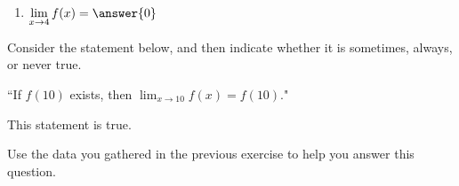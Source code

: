 \documentclass[handout]{ximera}
\begin{document}
\begin{exercise}
\begin{enumerate}

\item [] $\displaystyle\lim_{x\to 4} f(x) = \answer{0}$ 

\end{enumerate}

\end{exercise}

\begin{exercise}

Consider the statement below, and then indicate whether it is sometimes, always, or never true.

\begin{center} ``If $f(10)$ exists, then $\displaystyle\lim_{x\to 10} f(x) = f(10).$" \end{center}

This statement is  true.

\begin{hint}

Use the data you gathered in the previous exercise to help you answer this question.  

\end{hint}

\end{exercise}
\end{document}

